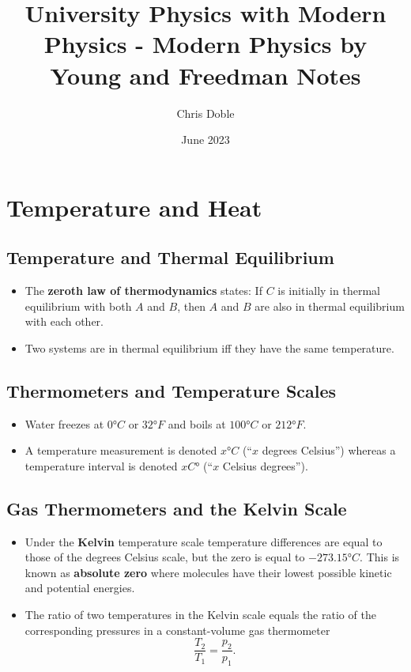 \documentclass{article}
\title{University Physics with Modern Physics - Modern Physics by Young and Freedman Notes}
\author{Chris Doble}
\date{June 2023}
\begin{document}
\maketitle

\tableofcontents

\setcounter{section}{16}
\section{Temperature and Heat}

\subsection{Temperature and Thermal Equilibrium}

\begin{itemize}
  \item The \textbf{zeroth law of thermodynamics} states: If $C$ is initially in thermal equilibrium with both $A$ and $B$, then $A$ and $B$ are also in thermal equilibrium with each other.

  \item Two systems are in thermal equilibrium iff they have the same temperature.
\end{itemize}

\subsection{Thermometers and Temperature Scales}

\begin{itemize}
  \item Water freezes at $\ang{0} \unit{C}$ or $\ang{32} \unit{F}$ and boils at $\ang{100} \unit{C}$ or $\ang{212} \unit{F}$.

  \item A temperature measurement is denoted $x \unit{\degree C}$ (``$x$ degrees Celsius'') whereas a temperature interval is denoted $x \unit{C \degree}$ (``$x$ Celsius degrees'').
\end{itemize}

\subsection{Gas Thermometers and the Kelvin Scale}

\begin{itemize}
  \item Under the \textbf{Kelvin} temperature scale temperature differences are equal to those of the degrees Celsius scale, but the zero is equal to $\ang{-273.15} \unit{C}$. This is known as \textbf{absolute zero} where molecules have their lowest possible kinetic and potential energies.

  \item The ratio of two temperatures in the Kelvin scale equals the ratio of the corresponding pressures in a constant-volume gas thermometer \[\frac{T_2}{T_1} = \frac{p_2}{p_1}.\]
\end{itemize}
\end{document}
